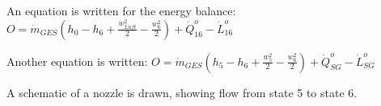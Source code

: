 An equation is written for the energy balance:  
\( O = \dot{m}_{GES} (h_0 - h_6 + \frac{w_{Luft}^2}{2} - \frac{w_6^2}{2}) + \dot{Q}_{16}^o - \dot{L}_{16}^o \)  

Another equation is written:  
\( O = \dot{m}_{GES} (h_5 - h_6 + \frac{w_5^2}{2} - \frac{w_6^2}{2}) + \dot{Q}_{SG}^o - \dot{L}_{SG}^o \)  

A schematic of a nozzle is drawn, showing flow from state 5 to state 6.